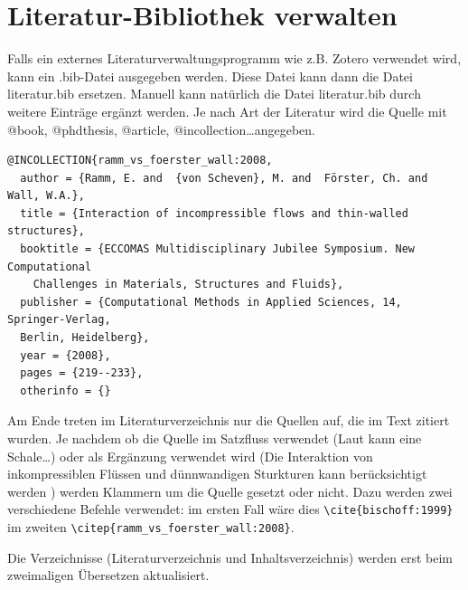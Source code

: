 \section{Literatur-Bibliothek verwalten}
Falls ein externes Literaturverwaltungsprogramm wie z.B. Zotero verwendet wird,
kann ein .bib-Datei ausgegeben werden. Diese Datei kann dann die Datei literatur.bib
ersetzen. Manuell kann natürlich die Datei literatur.bib durch weitere Einträge
ergänzt werden. Je nach Art der Literatur wird die Quelle mit @book, @phdthesis,
@article, @incollection\ldots angegeben.
\begin{verbatim}
@INCOLLECTION{ramm_vs_foerster_wall:2008,
  author = {Ramm, E. and  {von Scheven}, M. and  Förster, Ch. and  Wall, W.A.},
  title = {Interaction of incompressible flows and thin-walled structures},
  booktitle = {ECCOMAS Multidisciplinary Jubilee Symposium. New Computational
    Challenges in Materials, Structures and Fluids},
  publisher = {Computational Methods in Applied Sciences, 14, Springer-Verlag,
  Berlin, Heidelberg},
  year = {2008},
  pages = {219--233},
  otherinfo = {}
\end{verbatim}
Am Ende treten im Literaturverzeichnis nur die Quellen auf, die im Text
zitiert wurden. Je nachdem ob die Quelle im Satzfluss verwendet
(Laut \cite{bischoff:1999} kann eine Schale\ldots) oder als Ergänzung verwendet
wird (Die Interaktion von inkompressiblen Flüssen und dünnwandigen Sturkturen
kann berücksichtigt werden \citep{ramm_vs_foerster_wall:2008})
werden Klammern um die Quelle gesetzt oder nicht. Dazu werden zwei verschiedene
Befehle verwendet: im ersten Fall wäre dies
\verb+\cite{bischoff:1999}+ im zweiten
\verb+\citep{ramm_vs_foerster_wall:2008}+.

Die Verzeichnisse (Literaturverzeichnis und Inhaltsverzeichnis) werden erst beim
zweimaligen Übersetzen aktualisiert.


